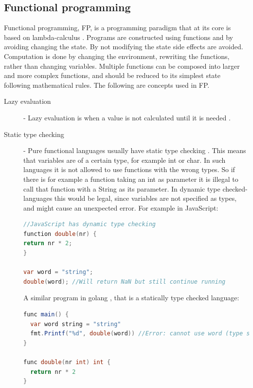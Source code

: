 \documentclass {article}
\begin{document}
\subsection{Functional programming}
Functional programming, FP, is a programming paradigm that at its core is based on lambda-calculus \cite{gabmar}. Programs are constructed using functions and by avoiding changing the state. By not modifying the state side effects are avoided. Computation is done by changing the environment, rewriting the functions, rather than changing variables. Multiple functions can be composed into larger and more complex functions, and should be reduced to its simplest state following mathematical rules. The following are concepts used in FP.
\begin{description}
\item [Lazy evaluation] - Lazy evaluation is when a value is not calculated until it is needed \cite{fogus}.
\item [Static type checking] - Pure functional languages usually have static type checking \cite{gabmar}. This means that variables are of a certain type, for example int or char. In such languages it is not allowed to use functions with the wrong types. So if there is for example a function taking an int as parameter it is illegal to call that function with a String as its parameter. In dynamic type checked-languages this would be legal, since variables are not specified as types, and might cause an unexpected error. For example in JavaScript:

\begin{lstlisting}[language=Java]
//JavaScript has dynamic type checking
function double(nr) {
return nr * 2;
}

var word = "string";
double(word); //Will return NaN but still continue running
\end{lstlisting}

\item [ ] A similar program in golang \cite{golang}, that is a statically type checked language:

\begin{lstlisting}[language=Java]
func main() {
  var word string = "string"
  fmt.Printf("%d", double(word)) //Error: cannot use word (type string) as type int in argument to double
}

func double(nr int) int {
  return nr * 2
}
\end{lstlisting}


\end{description}
\end{document}
